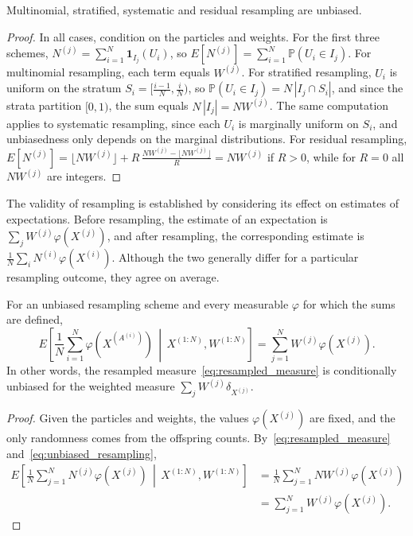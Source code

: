 \begin{proposition}
    \label{prop:resampling_schemes_unbiased}
    Multinomial, stratified, systematic and residual resampling are unbiased.
\end{proposition}
\begin{proof}
    In all cases, condition on the particles and weights. For the first three schemes, $N^{(j)} = \sum_{i=1}^{N}\mathbf{1}_{I_j}(U_i)$, so $E[N^{(j)}] = \sum_{i=1}^{N}\mathbb{P}(U_i\in I_j)$. For multinomial resampling, each term equals $W^{(j)}$. For stratified resampling, $U_i$ is uniform on the stratum $S_i = [\frac{i-1}{N},\frac{i}{N})$, so $\mathbb{P}(U_i\in I_j) = N\,|I_j\cap S_i|$, and since the strata partition $[0,1)$, the sum equals $N\,|I_j| = NW^{(j)}$. The same computation applies to systematic resampling, since each $U_i$ is marginally uniform on $S_i$, and unbiasedness only depends on the marginal distributions. For residual resampling, $E[N^{(j)}] = \lfloor NW^{(j)}\rfloor + R\,\frac{NW^{(j)}-\lfloor NW^{(j)}\rfloor}{R} = NW^{(j)}$ if $R>0$, while for $R=0$ all $NW^{(j)}$ are integers.
\end{proof}

The validity of resampling is established by considering its effect on estimates of expectations. Before resampling, the estimate of an expectation is $\sum_jW^{(j)}\varphi(X^{(j)})$, and after resampling, the corresponding estimate is $\frac{1}{N}\sum_iN^{(i)}\varphi(X^{(i)})$. Although the two generally differ for a particular resampling outcome, they agree on average.

\begin{proposition}
    \label{prop:resampling_unbiased}
    For an unbiased resampling scheme and every measurable $\varphi$ for which the sums are defined,
    \begin{equation}
        E\left[\frac{1}{N}\sum_{i=1}^{N}\varphi(X^{(A^{(i)})})\,\middle|\,X^{(1:N)},W^{(1:N)}\right] = \sum_{j=1}^{N}W^{(j)}\varphi(X^{(j)}).
    \end{equation}
    In other words, the resampled measure~\eqref{eq:resampled_measure} is conditionally unbiased for the weighted measure $\sum_jW^{(j)}\delta_{X^{(j)}}$.
\end{proposition}
\begin{proof}
    Given the particles and weights, the values $\varphi(X^{(j)})$ are fixed, and the only randomness comes from the offspring counts. By~\eqref{eq:resampled_measure} and~\eqref{eq:unbiased_resampling},
    \begin{align}
        E\left[\frac{1}{N}\sum_{j=1}^{N}N^{(j)}\varphi(X^{(j)})\,\middle|\,X^{(1:N)},W^{(1:N)}\right] &= \frac{1}{N}\sum_{j=1}^{N}NW^{(j)}\varphi(X^{(j)}) \\
        &= \sum_{j=1}^{N}W^{(j)}\varphi(X^{(j)}).
    \end{align}
\end{proof}

